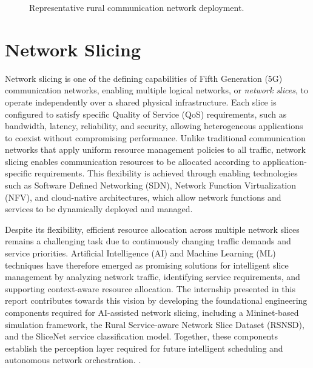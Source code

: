 \documentclass[12pt,a4paper]{report}
\begin{document}
	\begin{figure}[H]
		\centering
		\fbox{\rule{0pt}{3.5in}\rule{0.9\textwidth}{0pt}}
		\caption{Representative rural communication network deployment.}
		\label{fig:rural_network}
	\end{figure}
	
	\section{Network Slicing}
	\label{sec:slicing}
	
	Network slicing is one of the defining capabilities of Fifth Generation (5G) communication networks, enabling multiple logical networks, or \emph{network slices}, to operate independently over a shared physical infrastructure. Each slice is configured to satisfy specific Quality of Service (QoS) requirements, such as bandwidth, latency, reliability, and security, allowing heterogeneous applications to coexist without compromising performance. Unlike traditional communication networks that apply uniform resource management policies to all traffic, network slicing enables communication resources to be allocated according to application-specific requirements. This flexibility is achieved through enabling technologies such as Software Defined Networking (SDN), Network Function Virtualization (NFV), and cloud-native architectures, which allow network functions and services to be dynamically deployed and managed.
	
	Despite its flexibility, efficient resource allocation across multiple network slices remains a challenging task due to continuously changing traffic demands and service priorities. Artificial Intelligence (AI) and Machine Learning (ML) techniques have therefore emerged as promising solutions for intelligent slice management by analyzing network traffic, identifying service requirements, and supporting context-aware resource allocation. The internship presented in this report contributes towards this vision by developing the foundational engineering components required for AI-assisted network slicing, including a Mininet-based simulation framework, the Rural Service-aware Network Slice Dataset (RSNSD), and the SliceNet service classification model. Together, these components establish the perception layer required for future intelligent scheduling and autonomous network orchestration.
	.
	
	
\end{document}
